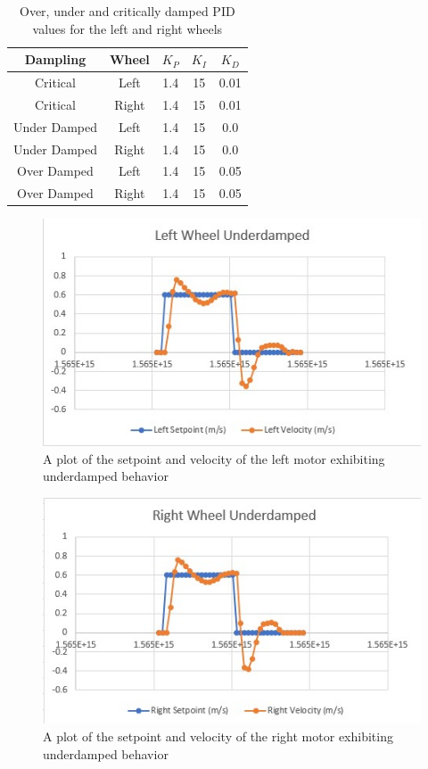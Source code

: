 \documentclass[conference]{IEEEtran}
\begin{document}
\begin{table}[h]
\caption{Over, under and critically damped PID values for the left and right wheels}
\label{tab:params}
\begin{center}
\begin{tabular}{|c|c|c| c| c|}
\hline
Dampling & Wheel & $K_{P}$ & $K_{I}$ & $K_{D}$ \\
\hline
    Critical & Left & 1.4 &15 &0.01\\
    Critical & Right & 1.4 &15 &0.01\\
    Under Damped & Left & 1.4 &15 &0.0\\
    Under Damped & Right & 1.4 &15 &0.0\\
    Over Damped & Left & 1.4 &15 &0.05\\
    Over Damped & Right & 1.4 &15 &0.05\\
\hline
\end{tabular}
\end{center}
\end{table}

\begin{figure}
	\includegraphics[width=\linewidth]{lu.jpg}
	\caption{A plot of the setpoint and velocity of the left motor exhibiting underdamped behavior}
	\label{fig:lu}
\end{figure}

\begin{figure}
	\includegraphics[width=\linewidth]{ru.jpg}
	\caption{A plot of the setpoint and velocity of the right motor exhibiting underdamped behavior}
	\label{fig:ru}
\end{figure}
\end{document}
